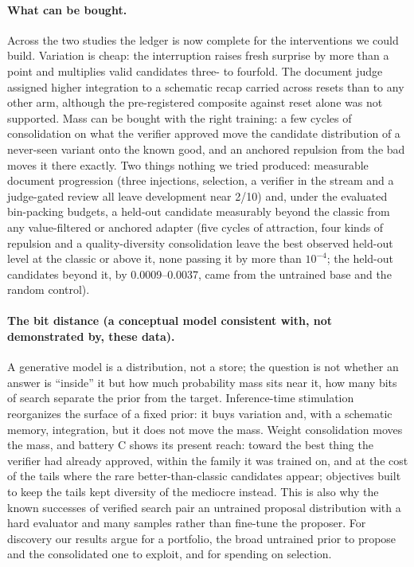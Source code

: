 \documentclass[11pt]{article}
\begin{document}
\paragraph{What can be bought.} Across the two studies the ledger is now
complete for the interventions we could build. Variation is cheap: the
interruption raises fresh surprise by more than a point and multiplies valid
candidates three- to fourfold. The document judge assigned higher
integration to a schematic recap carried across resets than to any other
arm, although the pre-registered composite against reset alone was not
supported. Mass can be bought with the right training: a few cycles of
consolidation on what the verifier approved move the candidate distribution
of a never-seen variant onto the known good, and an anchored repulsion from
the bad moves it there exactly. Two things nothing we tried produced:
measurable document progression (three injections, selection, a verifier
in the stream and a judge-gated review all leave development near 2/10)
and, under the evaluated bin-packing budgets, a held-out candidate
measurably beyond the classic from any value-filtered or anchored adapter
(five cycles of attraction, four kinds of repulsion and a
quality-diversity consolidation leave the best observed held-out level
at the classic or above it, none passing it by more than $10^{-4}$; the
held-out candidates beyond it, by 0.0009--0.0037, came from the
untrained base and the random control).

\paragraph{The bit distance (a conceptual model consistent with, not
demonstrated by, these data).} A generative model is a distribution, not a
store; the question is not whether an answer is ``inside'' it but how much
probability mass sits near it, how many bits of search separate the prior
from the target. Inference-time stimulation reorganizes the surface of a
fixed prior: it buys variation and, with a schematic memory, integration,
but it does not move the mass. Weight consolidation moves the mass, and
battery C shows its present reach: toward the best thing the verifier had
already approved, within the family it was trained on, and at the cost of
the tails where the rare better-than-classic candidates appear; objectives
built to keep the tails kept diversity of the mediocre instead. This is
also why the known successes of verified search \citep{romeraparedes2024funsearch,
novikov2025alphaevolve} pair an untrained proposal distribution with a hard
evaluator and many samples rather than fine-tune the proposer. For discovery
our results argue for a portfolio, the broad untrained prior to propose and
the consolidated one to exploit, and for spending on selection.
\end{document}
